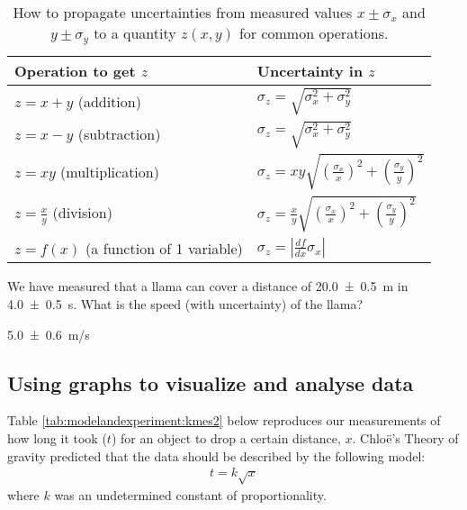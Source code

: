 \begin{table}[H]
\centering
\begin{tabular}{p{2.5in}p{2in}} 
\textbf{Operation to get $z$} &\textbf{Uncertainty in $z$} \\
\hline
\hline
$z=x+y$ (addition) &  $\sigma_z=\sqrt{\sigma_x^2+\sigma_y^2}$ \\ \hline
$z=x-y$ (subtraction) & $\sigma_z=\sqrt{\sigma_x^2+\sigma_y^2}$ \\ \hline
$z=xy$ (multiplication) & $\sigma_z=xy\sqrt{\left(\frac{\sigma_x}{x}\right)^2+\left(\frac{\sigma_y}{y}\right)^2}$ \\ \hline
$z=\frac{x}{y}$ (division) & $\sigma_z=\frac{x}{y}\sqrt{\left(\frac{\sigma_x}{x}\right)^2+\left(\frac{\sigma_y}{y}\right)^2}$ \\ \hline
$z=f(x)$ (a function of 1 variable) &$\sigma_z=\left|\frac{df}{dx}\sigma_x \right|$ \\ \hline
\end{tabular}
\caption{\label{tab:modelandexperiment:prop_uncertainties} How to propagate uncertainties from measured values $x\pm\sigma_x$ and $y\pm\sigma_y$ to a quantity $z(x,y)$ for common operations.}
\end{table}

\begin{checkpoint}{We have measured that a llama can cover a distance of \SI{20.0 \pm 0.5}{m} in \SI{4.0\pm 0.5}{s}. What is the speed (with uncertainty) of the llama?}
\begin{answer}
\SI{5.0 \pm 0.6}{m/s}
\end{answer}
\end{checkpoint}

\subsection{Using graphs to visualize and analyse data}
Table \ref{tab:modelandexperiment:kmes2} below reproduces our measurements of how long it took ($t$) for an object to drop a certain distance, $x$.  Chlo\"e's Theory of gravity predicted that the data should be described by the following model:
\begin{align*}
t = k \sqrt{x}
\end{align*}
where $k$ was an undetermined constant of proportionality.

